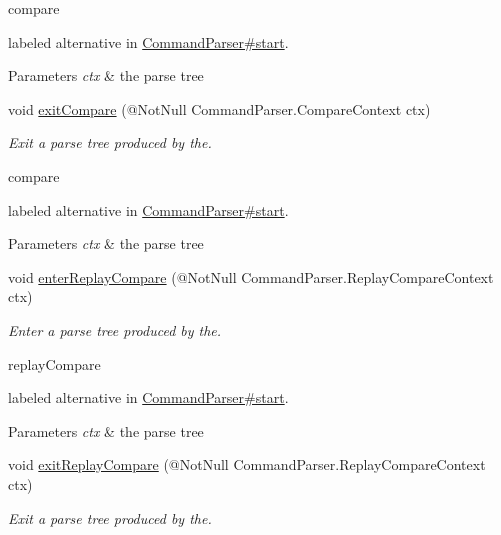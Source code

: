 \begin{DoxyCompactItemize}
\begin{DoxyCompactList}
\begin{DoxyCode}
compare 
\end{DoxyCode}
 labeled alternative in \hyperlink{}{Command\+Parser\#start}. 
\begin{DoxyParams}{Parameters}
{\em ctx} & the parse tree\\
\hline
\end{DoxyParams}
 \end{DoxyCompactList}\item 
void \hyperlink{classedu_1_1udel_1_1cis_1_1vsl_1_1civl_1_1run_1_1common_1_1CommandBaseListener_a7a324c7e790e434f98f6306ce8f8c3c4}{exit\+Compare} (@Not\+Null Command\+Parser.\+Compare\+Context ctx)
\begin{DoxyCompactList}\small\item\em Exit a parse tree produced by the.


\begin{DoxyCode}
compare 
\end{DoxyCode}
 labeled alternative in \hyperlink{}{Command\+Parser\#start}. 
\begin{DoxyParams}{Parameters}
{\em ctx} & the parse tree\\
\hline
\end{DoxyParams}
 \end{DoxyCompactList}\item 
void \hyperlink{classedu_1_1udel_1_1cis_1_1vsl_1_1civl_1_1run_1_1common_1_1CommandBaseListener_a5efeffade607a0b77674211bb8cdd4ab}{enter\+Replay\+Compare} (@Not\+Null Command\+Parser.\+Replay\+Compare\+Context ctx)
\begin{DoxyCompactList}\small\item\em Enter a parse tree produced by the.


\begin{DoxyCode}
replayCompare 
\end{DoxyCode}
 labeled alternative in \hyperlink{}{Command\+Parser\#start}. 
\begin{DoxyParams}{Parameters}
{\em ctx} & the parse tree\\
\hline
\end{DoxyParams}
 \end{DoxyCompactList}\item 
void \hyperlink{classedu_1_1udel_1_1cis_1_1vsl_1_1civl_1_1run_1_1common_1_1CommandBaseListener_a90fc1b6bb340e4c2d91dd2017cabef67}{exit\+Replay\+Compare} (@Not\+Null Command\+Parser.\+Replay\+Compare\+Context ctx)
\begin{DoxyCompactList}\small\item\em Exit a parse tree produced by the.



\end{DoxyCompactList}
\end{DoxyCompactItemize}
